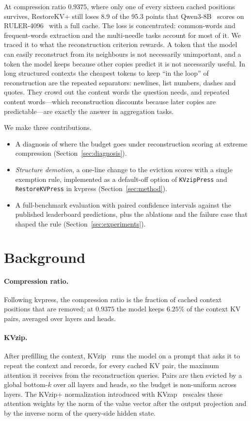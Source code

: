 \documentclass[11pt]{article}
\begin{document}
At compression ratio $0.9375$, where only one of every sixteen cached positions survives, RestoreKV+ still loses 8.9 of the 95.3
points that Qwen3-8B~\cite{yang2025qwen3} scores on RULER-4096~\cite{hsieh2024ruler} with a full cache. The loss is
concentrated: common-words and frequent-words extraction and the multi-needle tasks account for most of it. We traced it to what
the reconstruction criterion rewards. A token that the model can easily reconstruct from its neighbours is not necessarily
unimportant, and a token the model keeps because other copies predict it is not necessarily useful. In long structured contexts
the cheapest tokens to keep ``in the loop'' of reconstruction are the repeated separators: newlines, list numbers, dashes and
quotes. They crowd out the content words the question needs, and repeated content words---which reconstruction discounts because
later copies are predictable---are exactly the answer in aggregation tasks.

We make three contributions.
\begin{itemize}
  \item A diagnosis of where the budget goes under reconstruction scoring at extreme compression (Section~\ref{sec:diagnosis}).
  \item \emph{Structure demotion}, a one-line change to the eviction scores with a single exemption rule, implemented as a
        default-off option of \texttt{KVzipPress} and \texttt{RestoreKVPress} in kvpress (Section~\ref{sec:method}).
  \item A full-benchmark evaluation with paired confidence intervals against the published leaderboard predictions, plus the
        ablations and the failure case that shaped the rule (Section~\ref{sec:experiments}).
\end{itemize}

\section{Background}
\label{sec:background}
\paragraph{Compression ratio.} Following kvpress, the compression ratio is the fraction of cached context positions that are
removed; at $0.9375$ the model keeps $6.25\%$ of the context KV pairs, averaged over layers and heads.

\paragraph{KVzip.} After prefilling the context, KVzip~\cite{kim2025kvzip} runs the model on a prompt that asks it to repeat the
context and records, for every cached KV pair, the maximum attention it receives from the reconstruction queries. Pairs are then
evicted by a global bottom-$k$ over all layers and heads, so the budget is non-uniform across layers. The KVzip+ normalization
introduced with KVzap~\cite{jegou2026kvzap} rescales these attention weights by the norm of the value vector after the output
projection and by the inverse norm of the query-side hidden state.
\end{document}

